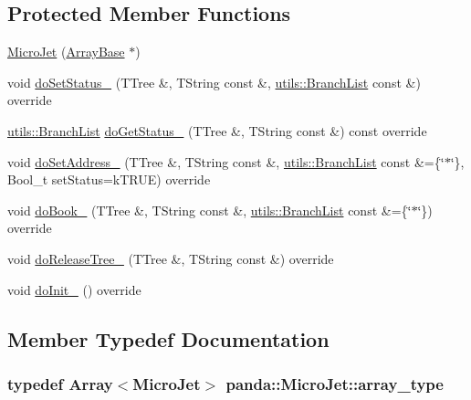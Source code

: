 \subsection*{Protected Member Functions}
\begin{DoxyCompactItemize}
\item 
\hyperlink{classpanda_1_1MicroJet_a5c8d4adb3eb683f32bc36a17fb1dc8cc}{MicroJet} (\hyperlink{classpanda_1_1ArrayBase}{ArrayBase} $\ast$)
\item 
void \hyperlink{classpanda_1_1MicroJet_ae7b83b860f85cc86b736495317fb7f3a}{doSetStatus\_\-} (TTree \&, TString const \&, \hyperlink{classpanda_1_1utils_1_1BranchList}{utils::BranchList} const \&) override
\item 
\hyperlink{classpanda_1_1utils_1_1BranchList}{utils::BranchList} \hyperlink{classpanda_1_1MicroJet_a2055608524fe0bb8e4fae8ef78e3333e}{doGetStatus\_\-} (TTree \&, TString const \&) const override
\item 
void \hyperlink{classpanda_1_1MicroJet_a6a8758a218f0e0ce60a1af0a999ff598}{doSetAddress\_\-} (TTree \&, TString const \&, \hyperlink{classpanda_1_1utils_1_1BranchList}{utils::BranchList} const \&=\{\char`\"{}$\ast$\char`\"{}\}, Bool\_\-t setStatus=kTRUE) override
\item 
void \hyperlink{classpanda_1_1MicroJet_aa1f5281c41c34033e5ef194f9d846413}{doBook\_\-} (TTree \&, TString const \&, \hyperlink{classpanda_1_1utils_1_1BranchList}{utils::BranchList} const \&=\{\char`\"{}$\ast$\char`\"{}\}) override
\item 
void \hyperlink{classpanda_1_1MicroJet_a76d94a27064103f68ac0532d7d610889}{doReleaseTree\_\-} (TTree \&, TString const \&) override
\item 
void \hyperlink{classpanda_1_1MicroJet_a15d337ea6042caf8a37d2f4172b9ab01}{doInit\_\-} () override
\end{DoxyCompactItemize}


\subsection{Member Typedef Documentation}
\hypertarget{classpanda_1_1MicroJet_ac1892a7cfd937c8967fce27bcff9cdc7}{
\subsubsection[{array\_\-type}]{\setlength{\rightskip}{0pt plus 5cm}typedef {\bf Array}$<${\bf MicroJet}$>$ {\bf panda::MicroJet::array\_\-type}}}
\label{classpanda_1_1MicroJet_ac1892a7cfd937c8967fce27bcff9cdc7}



